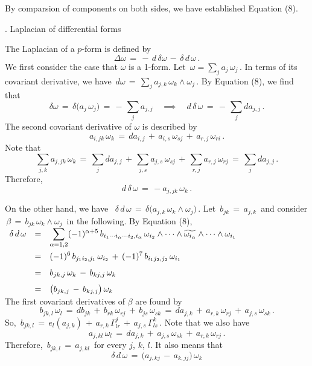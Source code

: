 \documentclass{article}[12pt,a4paper]
\begin{document}
By comparsion of components on both sides, we have established Equation (8). \\
\newpage

\begin{center} {. Laplacian of differential forms}\end{center}
The Laplacian of a $p$-form is defined by
$$ \Delta \omega \,=\, -\,d \, \delta \omega \,-\, \delta\, d\, \omega\,. $$
We first consider the case that $\omega$ is a 1-form. Let \,$\omega=\sum_{j} a_j \, \omega_j$\,.
In terms of its covariant derivative, we have \,$d\omega \,=\, \sum_j a_{j,k} \, \omega_k \wedge \omega_j$\,.
By Equation (8), we find that 
$$ \delta \omega \,=\, \delta\big( a_j\, \omega_j \big) \,=\, -\, \sum_j a_{j,j} 
\quad \implies \quad d\, \delta \, \omega \,=\, -\, \sum_j da_{j,j}\,. $$
The second covariant derivative of $\omega$ is described by
$$ a_{i,jk}\, \omega_k \,=\, da_{i,j} \,+\, a_{i,s}\, \omega_{sj} \,+\, a_{r,j}\, \omega_{ri}\,.$$
Note that 
$$ \sum_{j,k} a_{j,jk} \, \omega_k 
	\,=\, \sum_{j} da_{j,j} \,+\, \sum_{j,s} a_{j,s}\, \omega_{sj} \,+\, \sum_{r, j} a_{r, j}\, \omega_{rj} 
	\,=\, \sum_{j} da_{j,j}\,.$$
Therefore,
$$d\, \delta \, \omega \,=\,  - a_{j,jk}\, \omega_k\,.$$
\vspace*{0.1in}

On the other hand, we have \, $\delta\, d\, \omega \,=\, \delta\big( a_{j,k}\,\omega_k \wedge \omega_j \big)$\,.
Let \,$b_{jk}\,=\, a_{j,k}$\, and consider \,$\beta \,=\, b_{jk}\,\omega_k \wedge \omega_j$\, in the following.
By Equation (8), \\[0.1in]
$\begin{array}{rcl}
\delta\, d\, \omega &=& \displaystyle \sum_{\alpha=1,2} (-1)^{\alpha +5} \, b_{i_1\cdots i_\alpha\cdots i_2, i_\alpha}\, 
	\omega_{i_2} \wedge\cdots\wedge \widetilde{\omega_{i_\alpha}} \wedge\cdots\wedge \omega_{i_1} \\[0.2in]
&=& \displaystyle 
	(-1)^6\, b_{j_1 i_2, j_1}\, \omega_{i_2} \,+\, (-1)^7 \, b_{i_1 j_2, j_2}\, \omega_{i_1} \\[0.1in]
&=& \displaystyle 
	b_{jk, j}\, \omega_k \,-\, b_{kj, j}\, \omega_k \\[0.1in] 
&=& \displaystyle 
	\big( b_{jk, j} \,-\, b_{kj, j}\big) \, \omega_k
\end{array}$ \\[0.1in]

The first covariant derivatives of $\beta$ are found by
$$ b_{jk,l}\, \omega_l \,=\, db_{jk} \,+\, b_{rk}\, \omega_{rj} \,+\, b_{js}\, \omega_{sk}
\,=\, da_{j,k} \,+\, a_{r,k}\, \omega_{rj} \,+\, a_{j,s}\, \omega_{sk}\,.$$
So, \,$ b_{jk,l} \,=\, e_l(a_{j,k}) \,+\, a_{r,k}\, \Gamma_{lr}^j \,+\, a_{j,s}\, \Gamma_{ls}^k$\,.
Note that we also have
$$ a_{j, kl}\, \omega_l \,=\, da_{j,k} \,+\, a_{j,s}\, \omega_{sk} \,+\, a_{r,k}\, \omega_{rj}\,. $$
Therefore, \,$b_{jk,l} \,=\, a_{j,kl}$\, for every $j$, $k$, $l$. It also means that
$$ \delta\, d\, \omega \,=\, \big( a_{j,kj} \,-\, a_{k,jj} \big)\, \omega_k $$
\newpage 
\end{document}
